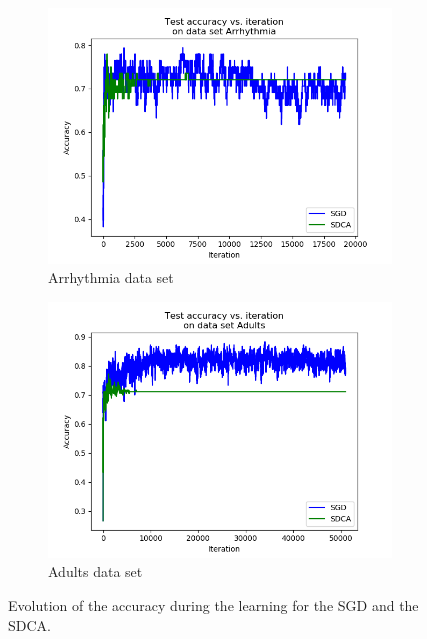 \documentclass{article}
\begin{document}
\begin{figure}[H]
	\centering
	\begin{subfigure}[t]{0.45\linewidth}
		\includegraphics[width=\linewidth]{arrhythmia.png}
		\caption{Arrhythmia data set}
	\end{subfigure}
	\begin{subfigure}[t]{0.45\linewidth}
		\includegraphics[width=\linewidth]{adults.png}
		\caption{Adults data set}
	\end{subfigure}
	\caption{Evolution of the accuracy during the learning for the SGD and the SDCA.}
\end{figure}

\end{document}
